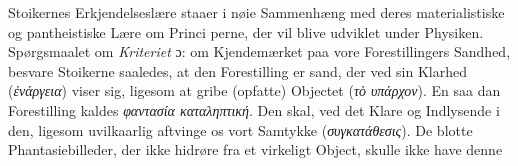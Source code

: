 \documentclass[12pt,a4paper]{book}
\newcommand{\gk}[1]{\textit{#1}}
\begin{document}
Stoikernes Erkjendelseslære staaer i nøie Sammenhæng
med deres materialistiske og pantheistiske Lære om Princi\-%
perne, der vil blive udviklet under Physiken.
Spørgsmaalet om \emph{Kriteriet} ɔ: om Kjendemærket paa
vore Forestillingers Sandhed, besvare Stoikerne saaledes, at
den Forestilling er sand, der ved sin Klarhed (\gk{ἐνάργεια}) viser
sig, ligesom at gribe (opfatte) Objectet (\gk{τὸ υπάρχον}). En saa\-%
dan Forestilling kaldes \gk{φαντασία καταληπτική}. Den skal, ved
det Klare og Indlysende i den, ligesom uvilkaarlig aftvinge os
vort Samtykke (\gk{συγκατάθεσις}). De blotte Phantasiebilleder,
der ikke hidrøre fra et virkeligt Object, skulle ikke have denne
\end{document}
